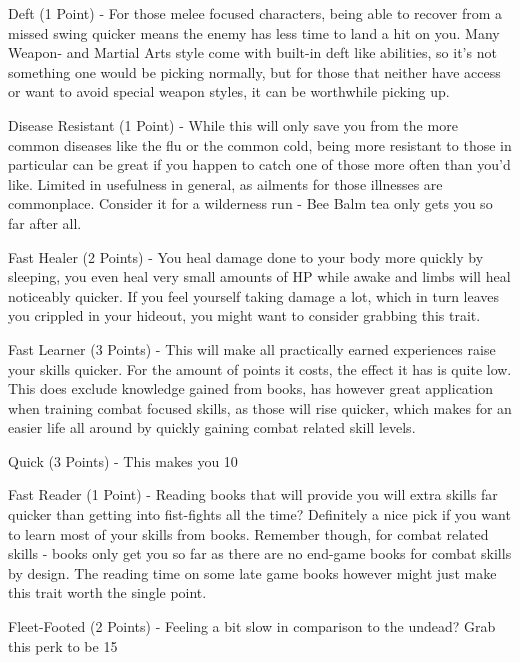 \documentclass[11pt]{report}
\begin{document}
Deft (1 Point) - For those melee focused characters, being able to recover from a missed swing quicker means the enemy has less time to land a hit on you. Many Weapon- and Martial Arts style come with built-in deft like abilities, so it's not something one would be picking normally, but for those that neither have access or want to avoid special weapon styles, it can be worthwhile picking up.

Disease Resistant (1 Point) - While this will only save you from the more common diseases like the flu or the common cold, being more resistant to those in particular can be great if you happen to catch one of those more often than you'd like. Limited in usefulness in general, as ailments for those illnesses are commonplace. Consider it for a wilderness run - Bee Balm tea only gets you so far after all.

Fast Healer (2 Points) - You heal damage done to your body more quickly by sleeping, you even heal very small amounts of HP while awake and limbs will heal noticeably quicker. If you feel yourself taking damage a lot, which in turn leaves you crippled in your hideout, you might want to consider grabbing this trait.

Fast Learner (3 Points) - This will make all practically earned experiences raise your skills quicker. For the amount of points it costs, the effect it has is quite low. This does exclude knowledge gained from books, has however great application when training combat focused skills, as those will rise quicker, which makes for an easier life all around by quickly gaining combat related skill levels.

Quick (3 Points) - This makes you 10%

Fast Reader (1 Point) - Reading books that will provide you will extra skills far quicker than getting into fist-fights all the time? Definitely a nice pick if you want to learn most of your skills from books. Remember though, for combat related skills - books only get you so far as there are no end-game books for combat skills by design. The reading time on some late game books however might just make this trait worth the single point.

Fleet-Footed (2 Points) - Feeling a bit slow in comparison to the undead? Grab this perk to be 15%
\end{document}
